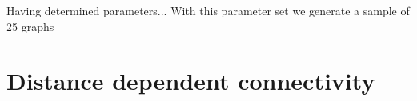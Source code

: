 Having determined parameters...
With this parameter set we generate a sample of 25 graphs %















\clearpage
\newpage




\section{Distance dependent connectivity}
\label{sec:distance_connectivity}



